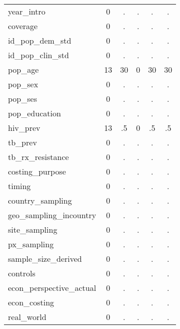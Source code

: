 \begin{table}[htbp]
\begin{tabular}{l*{1}{ccccc}}
year\_intro  &           0&           .&           .&           .&           .\\
coverage    &           0&           .&           .&           .&           .\\
id\_pop\_dem\_std&           0&           .&           .&           .&           .\\
id\_pop\_clin\_std&           0&           .&           .&           .&           .\\
pop\_age     &          13&          30&           0&          30&          30\\
pop\_sex     &           0&           .&           .&           .&           .\\
pop\_ses     &           0&           .&           .&           .&           .\\
pop\_education&           0&           .&           .&           .&           .\\
hiv\_prev    &          13&          .5&           0&          .5&          .5\\
tb\_prev     &           0&           .&           .&           .&           .\\
tb\_rx\_resistance&           0&           .&           .&           .&           .\\
costing\_purpose&           0&           .&           .&           .&           .\\
timing      &           0&           .&           .&           .&           .\\
country\_sampling&           0&           .&           .&           .&           .\\
geo\_sampling\_incountry&           0&           .&           .&           .&           .\\
site\_sampling&           0&           .&           .&           .&           .\\
px\_sampling &           0&           .&           .&           .&           .\\
sample\_size\_derived&           0&           .&           .&           .&           .\\
controls    &           0&           .&           .&           .&           .\\
econ\_perspective\_actual&           0&           .&           .&           .&           .\\
econ\_costing&           0&           .&           .&           .&           .\\
real\_world  &           0&           .&           .&           .&           .\\

\end{tabular}
\end{table}

